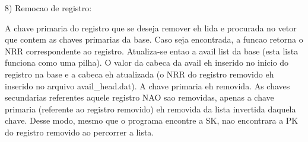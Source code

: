 \documentclass{article}
\begin{document}
8) Remocao de registro:

A chave primaria do registro que se deseja remover eh lida e procurada no vetor que contem as chaves primarias da base. Caso seja encontrada, a funcao retorna o NRR correspondente ao registro.
Atualiza-se entao a avail list da base (esta lista funciona como uma pilha).
O valor da cabeca da avail eh inserido no inicio do registro na base e a cabeca eh atualizada (o NRR do registro removido eh inserido no arquivo avail\_head.dat).
A chave primaria eh removida.
As chaves secundarias referentes aquele registro NAO sao removidas, apenas a chave primaria (referente ao registro removido) eh removida da lista invertida daquela chave. Desse modo, mesmo que o programa encontre a SK, nao encontrara a PK do registro removido ao percorrer a lista.
\end{document}
